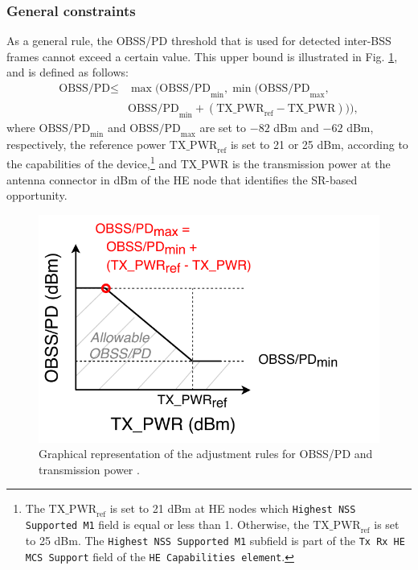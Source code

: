 \documentclass[comsoc]{IEEEtran}
\begin{document}
	\subsubsection{General constraints}
	As a general rule, the OBSS/PD threshold that is used for detected inter-BSS frames cannot exceed a certain value. This upper bound is illustrated in Fig. \ref{fig:fig_7}, and is defined as follows:
	\begin{align}\nonumber \text{OBSS/PD} \leq & \max\Big(\text{OBSS/PD}_{\min}, \min\big(\text{OBSS/PD}_{\max},\\ & \text{OBSS/PD}_{\min} + (\text{TX\_PWR}_{\text{ref}}-\text{TX\_PWR})\big)\Big), \nonumber \end{align}
	where $\text{OBSS/PD}_{\min}$ and $\text{OBSS/PD}_{\max}$ are set to $-82$ dBm and $-62$ dBm, respectively, the reference power $\text{TX\_PWR}_{\text{ref}}$ is set to 21 or 25 dBm, according to the
	capabilities of the device,\footnote{The $\text{TX\_PWR}_{\text{ref}}$ is set to 21 dBm at HE nodes which \texttt{Highest NSS Supported M1} field is equal or less than 1. Otherwise, the  $\text{TX\_PWR}_{\text{ref}}$ is set to 25 dBm. The \texttt{Highest NSS Supported M1} subfield is part of the \texttt{Tx Rx HE MCS Support} field of the \texttt{HE Capabilities element}.} and $\text{TX\_PWR}$ is the transmission power at the antenna connector in dBm of the HE node that identifies the SR-based opportunity.
	\begin{figure}[ht!]
		\centering
		\includegraphics[width=0.8\columnwidth]{fig_10}
		\caption{Graphical representation of the adjustment rules for OBSS/PD and transmission power \cite{tgax2019draft}.}
		\label{fig:fig_7}
	\end{figure}
	
\end{document}
